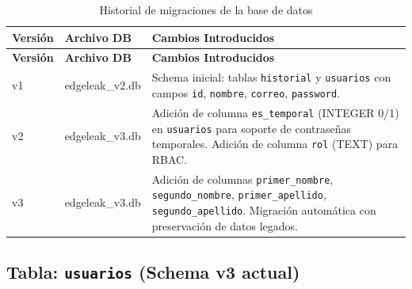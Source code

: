 \documentclass[12pt,a4paper]{article}
\begin{document}
\begin{longtable}{p{2cm} p{3.5cm} p{8cm}}
\caption{Historial de migraciones de la base de datos} \label{tab:historial-db} \\
\toprule
\textbf{Versión} & \textbf{Archivo DB} & \textbf{Cambios Introducidos} \\
\midrule
\endfirsthead
\toprule
\textbf{Versión} & \textbf{Archivo DB} & \textbf{Cambios Introducidos} \\
\midrule
\endhead
\bottomrule
\endlastfoot
v1 & edgeleak\_v2.db & Schema inicial: tablas \texttt{historial} y \texttt{usuarios} con campos \texttt{id}, \texttt{nombre}, \texttt{correo}, \texttt{password}. \\[0.3em]
v2 & edgeleak\_v3.db & Adición de columna \texttt{es\_temporal} (INTEGER 0/1) en \texttt{usuarios} para soporte de contraseñas temporales. Adición de columna \texttt{rol} (TEXT) para RBAC. \\[0.3em]
v3 & edgeleak\_v3.db & Adición de columnas \texttt{primer\_nombre}, \texttt{segundo\_nombre}, \texttt{primer\_apellido}, \texttt{segundo\_apellido}. Migración automática con preservación de datos legados. \\
\end{longtable}

\subsection{Tabla: \texttt{usuarios} (Schema v3 actual)}
\end{document}
